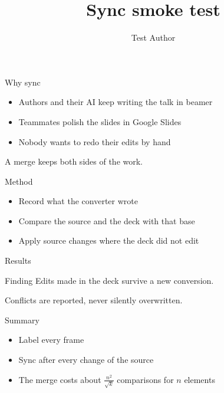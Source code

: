 \documentclass{beamer}
\title{Sync smoke test}
\author{Test Author}
\begin{document}
\begin{frame}[label=intro]{Why sync}
  \begin{itemize}
    \item Authors and their AI keep writing the talk in beamer
    \item Teammates polish the slides in Google Slides
    \item Nobody wants to redo their edits by hand
  \end{itemize}
  \vspace{1em}
  A merge keeps both sides of the work.
\end{frame}

\begin{frame}[label=method]{Method}
  \begin{itemize}
    \item Record what the converter wrote
    \item Compare the source and the deck with that base
    \item Apply source changes where the deck did not edit
  \end{itemize}
\end{frame}

\begin{frame}[label=results]{Results}
  \begin{block}{Finding}
    Edits made in the deck survive a new conversion.
  \end{block}
  \vspace{1em}
  Conflicts are reported, never silently overwritten.
\end{frame}

\begin{frame}[label=end]{Summary}
  \begin{itemize}
    \item Label every frame
    \item Sync after every change of the source
    \item The merge costs about $\frac{n^2}{\sqrt{k}}$ comparisons for $n$ elements
  \end{itemize}
\end{frame}
\end{document}
